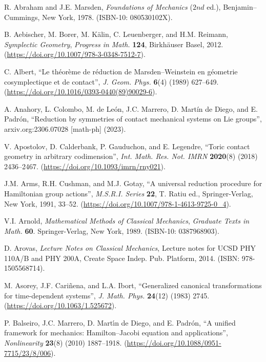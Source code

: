 \documentclass[12pt]{report}
\begin{document}
\begin{thebibliography}{999}

R. Abraham and J.E. Marsden,
\textit{Foundations of Mechanics}
($2nd$ ed.), Benjamin--Cummings, New York, 1978.
(ISBN-10: 080530102X).

B. Aebischer, M. Borer, M. K\"alin, C. Leuenberger, and H.M. Reimann,
{\it Symplectic Geometry},
{\sl Progress in Math.} {\bf 124},
Birkh\"auser Basel, 2012.
(\url{https://doi.org/10.1007/978-3-0348-7512-7}).

{\rm C. Albert},
``Le th\'eor\`eme de r\'eduction de Marsden--Weinstein en g\'eometrie
cosymplectique et de contact'',
{\sl  J. Geom. Phys.} {\bf 6}(4)  (1989) 627--649.
(\url{https://doi.org/10.1016/0393-0440(89)90029-6}).

A. Anahory, L. Colombo, M. de Le\'on, J.C. Marrero, D. Mart\'in de Diego, and E. Padrón,
``Reduction by symmetries of contact mechanical systems on Lie groups'', 
arxiv.org:2306.07028 [math-ph] (2023).

V. Apostolov, D. Calderbank, P. Gauduchon, and E. Legendre, 
``Toric contact geometry in arbitrary codimension'',
{\sl Int. Math. Res. Not. IMRN} {\bf 2020}(8) (2018) 2436--2467.
(\url{https://doi.org/10.1093/imrn/rny021}).

{\rm J.M. Arms, R.H. Cushman, and M.J. Gotay},
``A universal reduction procedure for Hamiltonian group actions'', 
{\sl M.S.R.I. Series} {\bf 22},
T. Ratiu ed., Springer-Verlag, New York,
1991, 33--52.
(\url{https://doi.org/10.1007/978-1-4613-9725-0_4}).

V.I. Arnold, 
{\it Mathematical Methods of Classical Mechanics},
{\sl Graduate Texts in Math.}
 {\bf 60}. Springer-Verlag, New York, 1989.
(ISBN-10: 0387968903).

D. Arovas,
{\it Lecture Notes on Classical Mechanics},
Lecture notes for UCSD PHY 110A/B and PHY 200A,
Create Space Indep. Pub. Platform, 2014.
(ISBN: 978-1505568714).

M. Asorey, J.F. Cari\~nena, and L.A. Ibort,
``Generalized canonical transformations for time-dependent systems'',
{\sl J. Math. Phys.} {\bf 24}(12) (1983) 2745.
(\url{https://doi.org/10.1063/1.525672}).

P. Balseiro, J.C. Marrero, D. Mart\'\i n de Diego, and E. Padr\'on, 
``A unified framework for mechanics: Hamilton--Jacobi equation and applications'',
 {\sl Nonlinearity} {\bf 23}(8) (2010) 1887--1918.
(\url{https://doi.org/10.1088/0951-7715/23/8/006}).


\end{thebibliography}
\end{document}
